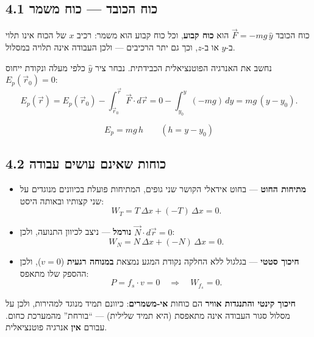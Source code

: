 \documentclass[12pt, a4paper]{article}
\newcommand{\hvec}[1]{\overrightarrow{#1}}
\begin{document}
\subsection*{4.1 כוח הכובד --- כוח משמר}

\begin{tcolorbox}[notebox, title={למה כל כוח קבוע הוא משמר?}]
כוח הכובד \textenglish{$\hvec{F} = -mg\,\hat{y}$} הוא \textbf{כוח קבוע}, וכל כוח קבוע הוא משמר: רכיב \textenglish{$x$} של הכוח אינו תלוי ב-\textenglish{$y$} או ב-\textenglish{$z$}, וכך גם יתר הרכיבים --- ולכן העבודה אינה תלויה במסלול.
\end{tcolorbox}

נחשב את האנרגיה הפוטנציאלית הכבידתית. נבחר ציר \textenglish{$\hat{y}$} כלפי מעלה ונקודת ייחוס \textenglish{$E_p(\hvec{r}_0)=0$}:
\[
  E_p(\hvec{r}) = E_p(\hvec{r}_0) - \int_{\hvec{r}_0}^{\hvec{r}}\!\hvec{F}\cdot d\hvec{r}
   = 0 - \int_{y_0}^{y} (-mg)\,dy
   = mg\,(y - y_0).
\]
\begin{tcolorbox}[resultbox, title={אנרגיה פוטנציאלית כבידתית}]
\[
  E_p = mg\,h
  \qquad (h = y - y_0)
\]
\end{tcolorbox}

\subsection*{4.2 כוחות שאינם עושים עבודה}

\begin{tcolorbox}[notebox, title={מתיחות, נורמל וחיכוך סטטי}]
\begin{itemize}
  \item \textbf{מתיחות החוט} --- בחוט אידאלי הקושר שני גופים, המתיחות פועלת בכיוונים מנוגדים על שני קצותיו ובאותה היסט:
        \[
          W_T = T\,\Delta x + (-T)\,\Delta x = 0 .
        \]
  \item \textbf{נורמל} --- ניצב לכיוון התנועה, ולכן \textenglish{$\hvec{N}\cdot d\hvec{r}=0$}:
        \[
          W_N = N\,\Delta x + (-N)\,\Delta x = 0 .
        \]
  \item \textbf{חיכוך סטטי} --- בגלגול ללא החלקה נקודת המגע נמצאת \textbf{במנוחה רגעית} (\textenglish{$v=0$}), ולכן ההספק שלו מתאפס:
        \[
          P = f_s \cdot v = 0
          \quad\Longrightarrow\quad
          W_{f_s} = 0 .
        \]
\end{itemize}
\end{tcolorbox}

\textbf{חיכוך קינטי והתנגדות אוויר} הם כוחות \textbf{אי-משמרים}: כיוונם תמיד מנוגד למהירות, ולכן על מסלול סגור העבודה אינה מתאפסת (היא תמיד שלילית) --- ``בורחת'' מהמערכת כחום. עבורם \textbf{אין} אנרגיה פוטנציאלית.
\end{document}
